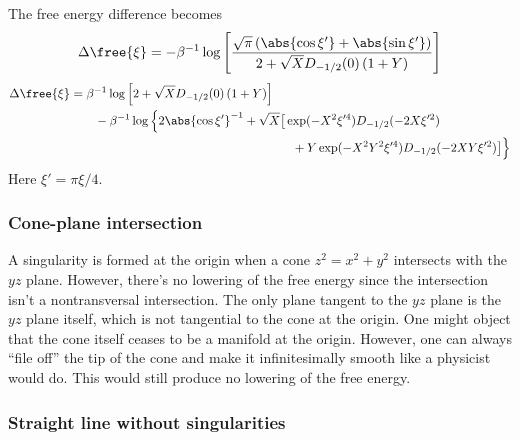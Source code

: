 The free energy difference becomes
%
\begin{equation}
  \Delta\free{\xi} = -\beta^{-1}\log\left[\frac{\sqrt{\pi}\left(\abs{\cos\xi'} + \abs{\sin\xi'}\right)}{2 + \sqrt{X}D_{-1/2}(0)\left(1 + Y\right)}\right]
\end{equation}
\begin{equation}
  \begin{aligned}
    \Delta\free{\xi} &= \beta^{-1}\log\left[2 + \sqrt{X}D_{-1/2}(0)\left(1 + Y\right)\right] \\
                     &\qquad -\beta^{-1}\log\Big\{2\abs{\cos\xi'}^{-1} + \sqrt{X}\big[\exp(-X^{2}\xi'^{4})D_{-1/2}(-2X\xi'^{2})\\
                     & \phantom{\qquad-\beta^{-1}\log\Big\{2\abs{\cos\xi'}^{-1} + \sqrt{X}\big[}
                 \quad+Y\exp(-X^{2}Y^{2}\xi'^{4})D_{-1/2}(-2XY\xi'^{2})\big]\Big\}   \end{aligned}
\end{equation}
%
Here $\xi' = \pi\xi/4$.

\subsubsection*{Cone-plane intersection}

A singularity is formed at the origin when a cone $z^2 = x^2 + y^2$ intersects with the $yz$ plane.
However, there's no lowering of the free energy since the intersection isn't a nontransversal intersection.
The only plane tangent to the $yz$ plane is the $yz$ plane itself, which is not tangential to the cone at the origin.
One might object that the cone itself ceases to be a manifold at the origin.
However, one can always ``file off'' the tip of the cone and make it infinitesimally smooth like a physicist would do.
This would still produce no lowering of the free energy.

\subsubsection*{Straight line without singularities}

